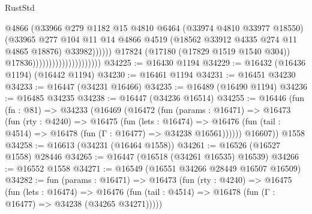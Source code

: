 \begin{lexlean}{RustStd}
\begin{coremodule}
                                                      @4866
                                                      (@33966
                                                        @279
                                                        @1182
                                                        @15
                                                        @4810
                                                        @6464
                                                        (@33974 @4810 @33977 @18550)
                                                        (@33965
                                                          @277
                                                          @104
                                                          @11
                                                          @14
                                                          @4866
                                                          @4519
                                                          (@18562
                                                            @33912
                                                            @4335
                                                            @274
                                                            @11
                                                            @4865
                                                            @18876)
                                                          @33982))))))
                                              @17824
                                              (@17180 (@17829 @1519 @1540 @304))
                                              @17836)))))))))))))))))))))
@34225 := @16430 @1194
@34229 := @16432 (@16436 @1194) (@16442 @1194)
@34230 := @16461 @1194
@34231 := @16451 @34230
@34233 := @16447 (@34231 @16466)
@34235 := @16489 (@16490 @1194)
@34236 := @16485 @34235
@34238 := @16447 (@34236 @16514)
@34255 := @16446
    (fun (fn : @81) =>
    @34233
      (@16469
        (@16472
          (fun (params : @16471) =>
          @16473
            (fun (rty : @4240) =>
            @16475
              (fun (lets : @16474) =>
              @16476 (fun (tail : @4514) => @16478 (fun (Γ : @16477) => @34238 @16561))))))
        @16607))
    @1558
@34258 := @16613 (@34231 (@16464 @1558))
@34261 := @16526 (@16527 @1558) @28446
@34265 := @16447 (@16518 (@34261 @16535) @16539)
@34266 := @16552 @1558
@34271 := @16549 (@16551 @34266 @28449 @16507 @16509)
@34282 := fun (params : @16471) =>
  @16473
    (fun (rty : @4240) =>
    @16475
      (fun (lets : @16474) =>
      @16476 (fun (tail : @4514) => @16478 (fun (Γ : @16477) => @34238 (@34265 @34271)))))

\end{coremodule}
\end{lexlean}
